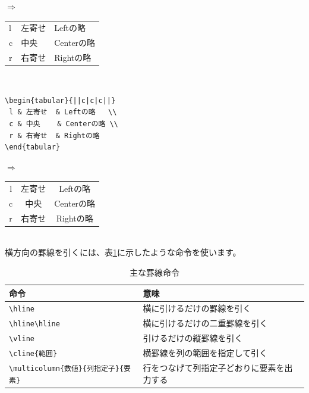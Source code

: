 $\Rightarrow$
\begin{minipage}{.45\textwidth}
\begin{shadebox}
\begin{tabular}{lll}
 l & 左寄せ  & Leftの略   \\
 c & 中央    & Centerの略 \\
 r & 右寄せ  & Rightの略
\end{tabular}
\end{shadebox}
\end{minipage}
\vspace*{1mm}\\
\begin{minipage}[c]{.50\textwidth}
\begin{screen}
\small
\begin{verbatim}
\begin{tabular}{||c|c|c||}
 l & 左寄せ  & Leftの略   \\
 c & 中央    & Centerの略 \\
 r & 右寄せ  & Rightの略
\end{tabular}
\end{verbatim}
\end{screen}
\end{minipage}%
$\Rightarrow$
\begin{minipage}{.45\textwidth}
\begin{shadebox}
\begin{tabular}{||c|c|c||}
 l & 左寄せ  & Leftの略   \\
 c & 中央    & Centerの略 \\
 r & 右寄せ  & Rightの略
\end{tabular}
\end{shadebox}
\end{minipage}
\vspace*{1mm}\\
横方向の罫線を引くには、表\ref{tab:rule}に示したような命令を使います。
\begin{table}[htbp]
\begin{center}
\caption{主な罫線命令}
\label{tab:rule}
\begin{tabular}{ll}
\hline
命令 & 意味 \\
\hline
\verb+\hline+             & 横に引けるだけの罫線を引く     \\
\verb+\hline\hline+  & 横に引けるだけの二重罫線を引く \\
\verb+\vline+             & 引けるだけの縦罫線を引く       \\
\verb+\cline{範囲}+    & 横罫線を列の範囲を指定して引く \\
\verb+\multicolumn{数値}{列指定子}{要素}+ &
                          行をつなげて列指定子どおりに要素を出力する \\
\hline
\end{tabular}
\end{center}
\end{table}

